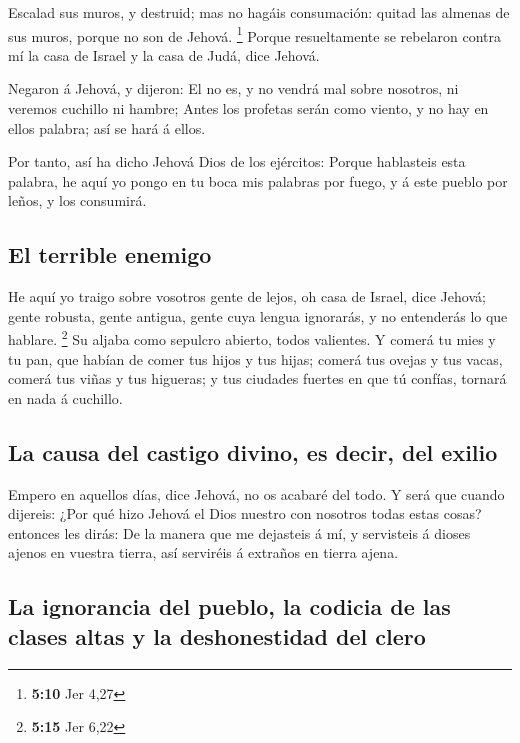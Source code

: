  Escalad sus muros, y destruid; mas no hagáis consumación:
quitad las almenas de sus muros, porque no son de Jehová. \footnote{\textbf{5:10}
  Jer 4,27}  Porque resueltamente se rebelaron contra mí la
casa de Israel y la casa de Judá, dice Jehová.

 Negaron á Jehová, y dijeron: El no es, y no vendrá mal
sobre nosotros, ni veremos cuchillo ni hambre;  Antes los
profetas serán como viento, y no hay en ellos palabra; así se hará á
ellos.

 Por tanto, así ha dicho Jehová Dios de los ejércitos:
Porque hablasteis esta palabra, he aquí yo pongo en tu boca mis palabras
por fuego, y á este pueblo por leños, y los consumirá.

\hypertarget{el-terrible-enemigo}{%
\subsection{El terrible enemigo}\label{el-terrible-enemigo}}

 He aquí yo traigo sobre vosotros gente de lejos, oh casa
de Israel, dice Jehová; gente robusta, gente antigua, gente cuya lengua
ignorarás, y no entenderás lo que hablare. \footnote{\textbf{5:15} Jer
  6,22}  Su aljaba como sepulcro abierto, todos valientes.
 Y comerá tu mies y tu pan, que habían de comer tus hijos y
tus hijas; comerá tus ovejas y tus vacas, comerá tus viñas y tus
higueras; y tus ciudades fuertes en que tú confías, tornará en nada á
cuchillo.

\hypertarget{la-causa-del-castigo-divino-es-decir-del-exilio}{%
\subsection{La causa del castigo divino, es decir, del
exilio}\label{la-causa-del-castigo-divino-es-decir-del-exilio}}

 Empero en aquellos días, dice Jehová, no os acabaré del
todo.  Y será que cuando dijereis: ¿Por qué hizo Jehová el
Dios nuestro con nosotros todas estas cosas? entonces les dirás: De la
manera que me dejasteis á mí, y servisteis á dioses ajenos en vuestra
tierra, así serviréis á extraños en tierra ajena.

\hypertarget{la-ignorancia-del-pueblo-la-codicia-de-las-clases-altas-y-la-deshonestidad-del-clero}{%
\subsection{La ignorancia del pueblo, la codicia de las clases altas y
la deshonestidad del
clero}\label{la-ignorancia-del-pueblo-la-codicia-de-las-clases-altas-y-la-deshonestidad-del-clero}}

